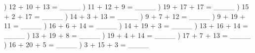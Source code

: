 \documentclass{article}%
\begin{document}
\newline%
) 12 + 10 + 13 = \_\_\_\_%
\newline%
\newline%
) 11 + 12 + 9 = \_\_\_\_%
\newline%
\newline%
) 19 + 17 + 17 = \_\_\_\_%
\newline%
\newline%
) 15 + 2 + 17 = \_\_\_\_%
\newline%
\newline%
) 14 + 3 + 13 = \_\_\_\_%
\newline%
\newline%
) 9 + 7 + 12 = \_\_\_\_%
\newline%
\newline%
) 9 + 19 + 11 = \_\_\_\_%
\newline%
\newline%
) 16 + 6 + 14 = \_\_\_\_%
\newline%
\newline%
) 14 + 19 + 3 = \_\_\_\_%
\newline%
\newline%
) 13 + 16 + 14 = \_\_\_\_%
\newline%
\newline%
) 13 + 19 + 8 = \_\_\_\_%
\newline%
\newline%
) 19 + 4 + 14 = \_\_\_\_%
\newline%
\newline%
) 17 + 7 + 13 = \_\_\_\_%
\newline%
\newline%
) 16 + 20 + 5 = \_\_\_\_%
\newline%
\newline%
) 3 + 15 + 3 = \_\_\_\_%
\end{document}

